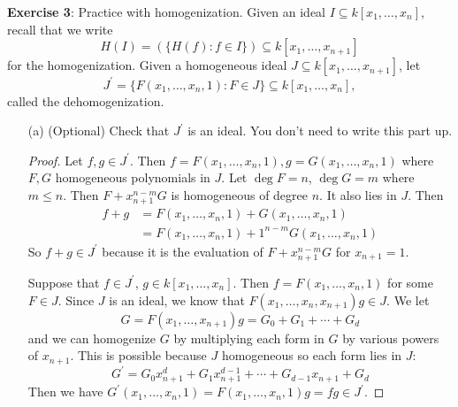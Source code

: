 \documentclass{article}
\begin{document}
\textbf{Exercise 3}: Practice with homogenization. Given an ideal $I \subseteq k[x_{1}, \ldots, x_{n}]$, recall that we write
    \begin{equation*}
        H(I) = (\{H(f) : f \in I\}) \subseteq k[x_{1}, \ldots, x_{n + 1}]
    \end{equation*}
for the homogenization. Given a homogeneous ideal $J \subseteq k[x_{1}, \ldots, x_{n + 1}]$, let
    \begin{equation*}
        J^{\prime} = \{F(x_{1}, \ldots, x_{n}, 1) : F \in J\} \subseteq k[x_{1}, \ldots, x_{n}], 
    \end{equation*}
called the dehomogenization.
    \begin{itemize}
        \item [(a)] (Optional) Check that $J^{\prime}$ is an ideal. You don't need to write this part up.
            \begin{proof}
                Let $f, g \in J^{\prime}$. Then $f = F(x_{1}, \ldots, x_{n}, 1), g = G(x_{1}, \ldots, x_{n}, 1)$ where $F, G$ homogeneous polynomials in $J$. Let $\deg F = n$, $\deg G = m$ where $m \leq n$. Then $F + x_{n + 1}^{n - m}G$ is homogeneous of degree $n$. It also lies in $J$. Then 
                    \begin{align*}
                        f + g &= F(x_{1}, \ldots, x_{n}, 1) + G(x_{1}, \ldots, x_{n}, 1) \\
                              &= F(x_{1}, \ldots, x_{n}, 1) + 1^{n - m}G(x_{1}, \ldots, x_{n}, 1)
                    \end{align*}
                So $f + g \in J^{\prime}$ because it is the evaluation of $F + x^{n - m}_{n + 1}G$ for $x_{n + 1} = 1$.

                Suppose that $f \in J^{\prime}$, $g \in k[x_{1}, \ldots, x_{n}]$. Then $f = F(x_{1}, \ldots, x_{n}, 1)$ for some $F \in J$. Since $J$ is an ideal, we know that $F(x_{1}, \ldots, x_{n}, x_{n + 1})g \in J$. We let 
                    \begin{equation*}
                        G = F(x_{1}, \ldots, x_{n + 1})g = G_{0} + G_{1} + \cdots + G_{d}
                    \end{equation*}
                and we can homogenize $G$ by multiplying each form in $G$ by various powers of $x_{n + 1}$. This is possible because $J$ homogeneous so each form lies in $J$:
                    \begin{equation*}
                        G^{\prime} = G_{0}x_{n + 1}^{d} + G_{1}x_{n + 1}^{d - 1} + \cdots + G_{d - 1}x_{n + 1} + G_{d}
                    \end{equation*}
                Then we have $G^{\prime}(x_{1}, \ldots, x_{n}, 1) = F(x_{1}, \ldots, x_{n}, 1)g = fg \in J^{\prime}$.
            \end{proof}


\end{itemize}
\end{document}
